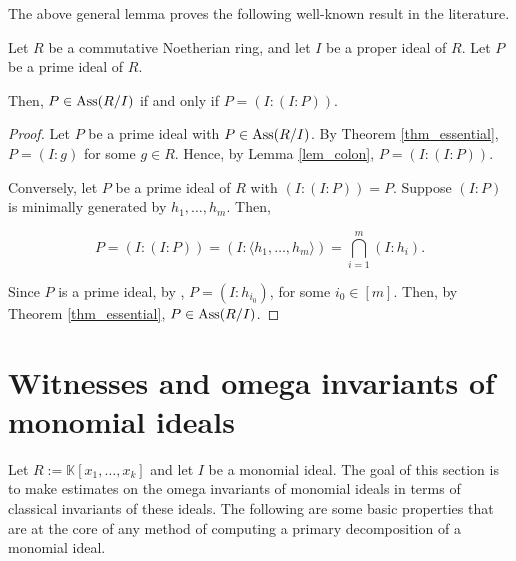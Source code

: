 \documentclass[11pt]{amsart}   %
\begin{document}
The above general lemma proves the following well-known result in the literature.

\begin{prop}\label{prop_assoc} Let $R$ be a commutative Noetherian ring, and let $I$ be a proper ideal of $R$. Let $P$ be a prime ideal of $R$. 

Then, $P\in{\rm Ass}(R/I)$ if and only if $P=(I:(I:P))$.
\end{prop}
\begin{proof} Let $P$ be a prime ideal with $P\in{\rm Ass}(R/I)$. By Theorem \ref{thm_essential}, $P=(I:g)$ for some $g\in R$. Hence, by Lemma \ref{lem_colon}, $P=(I:(I:P))$.

\medskip

Conversely, let $P$ be a prime ideal of $R$ with $(I:(I:P))=P$. Suppose $(I:P)$ is minimally generated by $h_1,\ldots,h_m$. Then,

$$P=(I:(I:P))=(I:\langle h_1,\ldots,h_m\rangle)=\bigcap_{i=1}^m(I:h_i).$$

Since $P$ is a prime ideal, by \cite[Corollary 3.56]{Sh}, $P=(I:h_{i_0})$, for some $i_0\in [m]$. Then, by Theorem \ref{thm_essential}, $P\in{\rm Ass}(R/I)$.
\end{proof}




\section{Witnesses and omega invariants of monomial ideals}\label{sec_monomial}

Let $R:=\mathbb K[x_1,\ldots,x_k]$ and let $I$ be a monomial ideal. The goal of this section is to make estimates on the omega invariants of monomial ideals in terms of classical invariants of these ideals. The following are some basic properties that are at the core of any method of computing a primary decomposition of a monomial ideal.
\end{document}

